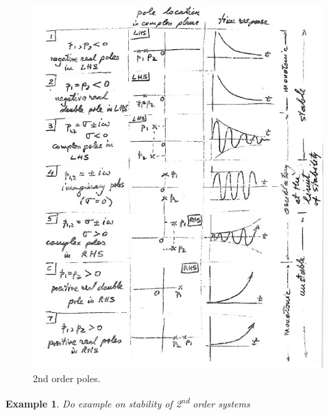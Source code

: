 \documentclass[12pt,letter]{article}
\newtheorem{ex}{Example}
\numberwithin{ex}{section} %
\newenvironment{example}{\begin{mdframed}[middlelinewidth=0.5mm]\begin{ex}\normalfont}{\end{ex}\end{mdframed}}
\numberwithin{re}{section} %
\numberwithin{equation}{section}	%
\begin{document}
\begin{figure}[H]
	\centering
	\includegraphics[width=6.5in]{../figures/2nd_order_poles.png}
	\caption{2nd order poles.}
\end{figure}



\begin{example}
Do example on stability of 2\textsuperscript{nd} order systems
\end{example}

%
%	
%	
%
%
%
\end{document}
